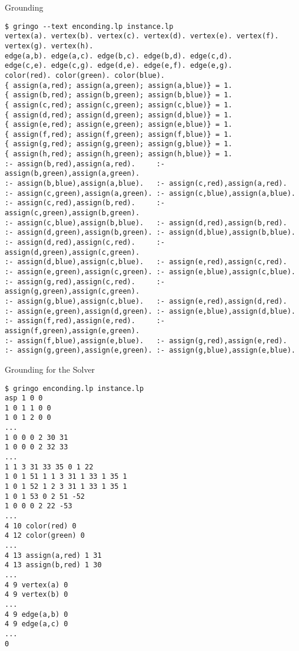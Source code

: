 \begin{frame}[fragile]{Grounding}
\begin{adjustbox}{max totalsize={\textwidth}{.83\textheight},keepaspectratio}
\begin{lstlisting}
$ gringo --text enconding.lp instance.lp
vertex(a). vertex(b). vertex(c). vertex(d). vertex(e). vertex(f). vertex(g). vertex(h).
edge(a,b). edge(a,c). edge(b,c). edge(b,d). edge(c,d).
edge(c,e). edge(c,g). edge(d,e). edge(e,f). edge(e,g).
color(red). color(green). color(blue).
{ assign(a,red); assign(a,green); assign(a,blue)} = 1.
{ assign(b,red); assign(b,green); assign(b,blue)} = 1.
{ assign(c,red); assign(c,green); assign(c,blue)} = 1.
{ assign(d,red); assign(d,green); assign(d,blue)} = 1.
{ assign(e,red); assign(e,green); assign(e,blue)} = 1.
{ assign(f,red); assign(f,green); assign(f,blue)} = 1.
{ assign(g,red); assign(g,green); assign(g,blue)} = 1.
{ assign(h,red); assign(h,green); assign(h,blue)} = 1.
:- assign(b,red),assign(a,red).     :- assign(b,green),assign(a,green).
:- assign(b,blue),assign(a,blue).   :- assign(c,red),assign(a,red).
:- assign(c,green),assign(a,green). :- assign(c,blue),assign(a,blue).
:- assign(c,red),assign(b,red).     :- assign(c,green),assign(b,green).
:- assign(c,blue),assign(b,blue).   :- assign(d,red),assign(b,red).
:- assign(d,green),assign(b,green). :- assign(d,blue),assign(b,blue).
:- assign(d,red),assign(c,red).     :- assign(d,green),assign(c,green).
:- assign(d,blue),assign(c,blue).   :- assign(e,red),assign(c,red).
:- assign(e,green),assign(c,green). :- assign(e,blue),assign(c,blue).
:- assign(g,red),assign(c,red).     :- assign(g,green),assign(c,green).
:- assign(g,blue),assign(c,blue).   :- assign(e,red),assign(d,red).
:- assign(e,green),assign(d,green). :- assign(e,blue),assign(d,blue).
:- assign(f,red),assign(e,red).     :- assign(f,green),assign(e,green).
:- assign(f,blue),assign(e,blue).   :- assign(g,red),assign(e,red).
:- assign(g,green),assign(e,green). :- assign(g,blue),assign(e,blue).
\end{lstlisting}
\end{adjustbox}
\end{frame}

\begin{frame}[fragile]{Grounding for the Solver}
\begin{adjustbox}{max totalsize={\textwidth}{.83\textheight},keepaspectratio}
\begin{lstlisting}
$ gringo enconding.lp instance.lp
asp 1 0 0
1 0 1 1 0 0
1 0 1 2 0 0
...
1 0 0 0 2 30 31
1 0 0 0 2 32 33
...
1 1 3 31 33 35 0 1 22
1 0 1 51 1 1 3 31 1 33 1 35 1
1 0 1 52 1 2 3 31 1 33 1 35 1
1 0 1 53 0 2 51 -52
1 0 0 0 2 22 -53
...
4 10 color(red) 0
4 12 color(green) 0
...
4 13 assign(a,red) 1 31
4 13 assign(b,red) 1 30
...
4 9 vertex(a) 0
4 9 vertex(b) 0
...
4 9 edge(a,b) 0
4 9 edge(a,c) 0
...
0
\end{lstlisting}
\end{adjustbox}
\end{frame}

